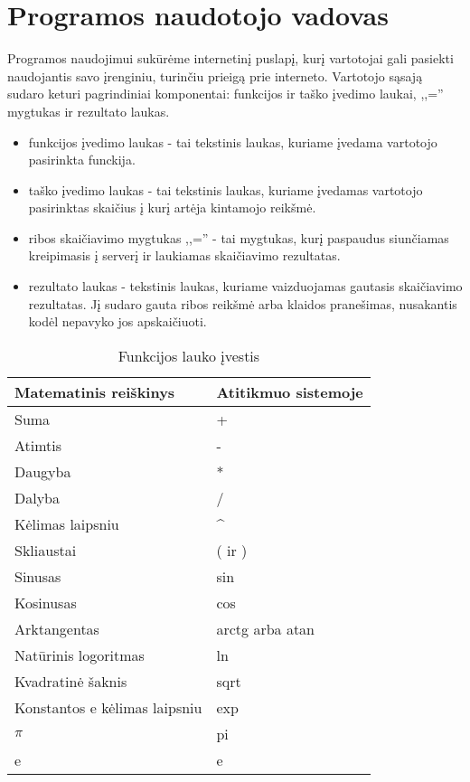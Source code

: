 \section{Programos naudotojo vadovas}

	Programos naudojimui sukūrėme internetinį puslapį, kurį vartotojai gali pasiekti 
	naudojantis savo įrenginiu, turinčiu prieigą prie interneto.
	Vartotojo sąsają sudaro keturi pagrindiniai komponentai: funkcijos ir taško įvedimo laukai, ,,='' mygtukas ir rezultato laukas.
	
	\begin{itemize}
		\item funkcijos įvedimo laukas - tai tekstinis laukas, kuriame įvedama vartotojo pasirinkta funckija.
		\item taško įvedimo laukas - tai tekstinis laukas, kuriame įvedamas vartotojo pasirinktas skaičius į kurį artėja kintamojo reikšmė.
		\item ribos skaičiavimo mygtukas ,,='' - tai mygtukas, kurį paspaudus siunčiamas kreipimasis į serverį ir laukiamas skaičiavimo rezultatas.
		\item rezultato laukas - tekstinis laukas, kuriame vaizduojamas gautasis skaičiavimo rezultatas. 
		Jį sudaro gauta ribos reikšmė arba klaidos pranešimas, nusakantis kodėl nepavyko jos apskaičiuoti.
	\end{itemize}
	
	
	
	\begin{table} [H]
		\renewcommand{\tabularxcolumn}[1]{m{#1}}
		\centering
		\caption{Funkcijos lauko įvestis}
		\label{tab:funcInput}
		\begin{tabular} {| l | l |}
			\hline
			Matematinis reiškinys					& Atitikmuo sistemoje 			\\
			\hline		
			Suma 									& +								\\
			\hline					
			Atimtis 								& -								\\
			\hline
			Daugyba									& *								\\
			\hline
			Dalyba 									& 	/							\\
			\hline
			Kėlimas laipsniu 						& \string^							\\
			\hline
			Skliaustai 								& ( ir )						\\
			\hline	
			Sinusas 								& sin  							\\
			\hline	
			Kosinusas								& cos 							\\
			\hline
			Arktangentas							& arctg arba atan				\\
			\hline
			Natūrinis logoritmas					& ln 							\\
			\hline
			Kvadratinė šaknis						& sqrt 							\\
			\hline
			Konstantos e kėlimas laipsniu			& exp 							\\
			\hline
			$\pi$									& pi							\\
			\hline	
			e 										& e								\\
			\hline
		\end{tabular}
	\end{table}
	

